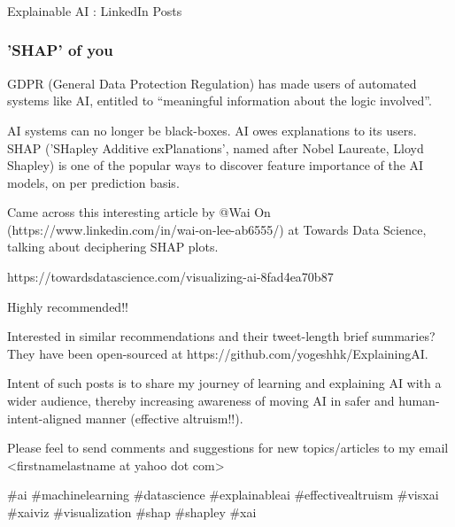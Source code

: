 \begin{frame}[fragile]\frametitle{}
\begin{center}
{\Large Explainable AI : LinkedIn Posts}
\end{center}
\end{frame}

\begin{frame}[fragile]\frametitle{'SHAP' of you}
GDPR (General Data Protection Regulation) has made users of automated systems like AI, entitled to “meaningful information about the logic involved”.

AI systems can no longer be black-boxes. AI owes explanations to its users. SHAP ('SHapley Additive exPlanations', named after Nobel Laureate, Lloyd Shapley)  is one of the popular ways to discover feature  importance of the AI models, on per prediction basis.


Came across this interesting article by @Wai On (https://www.linkedin.com/in/wai-on-lee-ab6555/) at Towards Data Science, talking about deciphering SHAP plots.

https://towardsdatascience.com/visualizing-ai-8fad4ea70b87

Highly recommended!!

Interested in similar recommendations and their tweet-length brief summaries? They have been open-sourced at https://github.com/yogeshhk/ExplainingAI. 

Intent of such posts is to share my journey of learning and explaining AI with a wider audience, thereby increasing awareness of moving AI in safer and human-intent-aligned manner (effective altruism!!).

Please feel to send comments and suggestions for new topics/articles to my email <firstnamelastname at yahoo dot com>


\#ai \#machinelearning \#datascience \#explainableai \#effectivealtruism \#visxai \#xaiviz \#visualization \#shap \#shapley \#xai
\end{frame}

